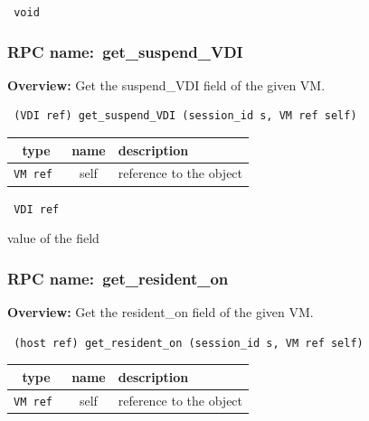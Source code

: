 \vspace{0.3cm}

{\tt 
void
}



\vspace{0.3cm}
\vspace{0.3cm}
\vspace{0.3cm}
\subsubsection{RPC name:~get\_suspend\_VDI}

{\bf Overview:} 
Get the suspend\_VDI field of the given VM.

\begin{verbatim} (VDI ref) get_suspend_VDI (session_id s, VM ref self)\end{verbatim}



 
\vspace{0.3cm}
\begin{tabular}{|c|c|p{7cm}|}
 \hline
{\bf type} & {\bf name} & {\bf description} \\ \hline
{\tt VM ref } & self & reference to the object \\ \hline 

\end{tabular}

\vspace{0.3cm}

{\tt 
VDI ref
}


value of the field
\vspace{0.3cm}
\vspace{0.3cm}
\vspace{0.3cm}
\subsubsection{RPC name:~get\_resident\_on}

{\bf Overview:} 
Get the resident\_on field of the given VM.

\begin{verbatim} (host ref) get_resident_on (session_id s, VM ref self)\end{verbatim}



 
\vspace{0.3cm}
\begin{tabular}{|c|c|p{7cm}|}
 \hline
{\bf type} & {\bf name} & {\bf description} \\ \hline
{\tt VM ref } & self & reference to the object \\ \hline 

\end{tabular}

